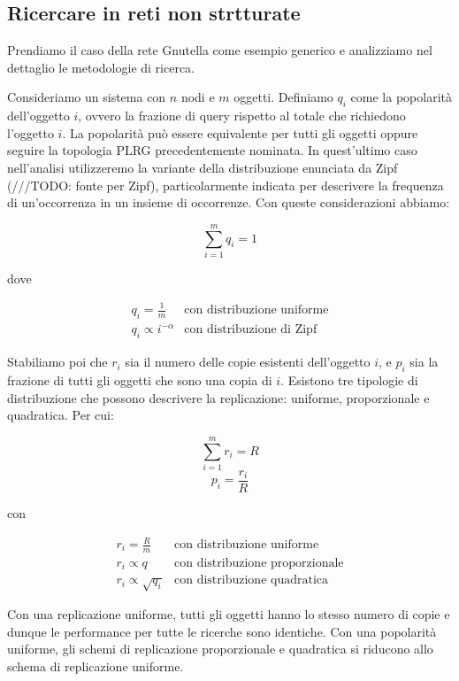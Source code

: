 \subsection{Ricercare in reti non
strtturate}\label{ricercare-in-reti-non-strtturate}

Prendiamo il caso della rete Gnutella come esempio generico e
analizziamo nel dettaglio le metodologie di ricerca.

Consideriamo un sistema con $n$ nodi e $m$ oggetti. Definiamo $q_i$ come
la popolarità dell'oggetto $i$, ovvero la frazione di query rispetto al
totale che richiedono l'oggetto $i$. La popolarità può essere
equivalente per tutti gli oggetti oppure seguire la topologia PLRG
precedentemente nominata. In quest'ultimo caso nell'analisi utilizzeremo
la variante della distribuzione enunciata da Zipf (///TODO: fonte per
Zipf), particolarmente indicata per descrivere la frequenza di
un'occorrenza in un insieme di occorrenze. Con queste considerazioni
abbiamo:

\[ \sum^m_{i=1} q_i = 1 \]

dove

\[ \begin{array}{ll} 
    q_i = \frac{1}{m} & \textrm{con distribuzione uniforme} \\
    q_i \propto i^{-\alpha} & \textrm{con distribuzione di Zipf}
    \end{array}
\]

Stabiliamo poi che $r_i$ sia il numero delle copie esistenti
dell'oggetto $i$, e $p_i$ sia la frazione di tutti gli oggetti che sono
una copia di $i$. Esistono tre tipologie di distribuzione che possono
descrivere la replicazione: uniforme, proporzionale e quadratica. Per
cui:

\[ \sum^m_{i=1} r_i = R \] \[ p_i = \frac{r_i}{R} \]

con

\[ \begin{array}{ll} 
    r_i = \frac{R}{m} & \textrm{con distribuzione uniforme} \\
    r_i \propto q & \textrm{con distribuzione proporzionale} \\
    r_i \propto \sqrt{q_i} & \textrm{con distribuzione quadratica}
    \end{array}
\]

Con una replicazione uniforme, tutti gli oggetti hanno lo stesso numero
di copie e dunque le performance per tutte le ricerche sono identiche.
Con una popolarità uniforme, gli schemi di replicazione proporzionale e
quadratica si riducono allo schema di replicazione uniforme.

